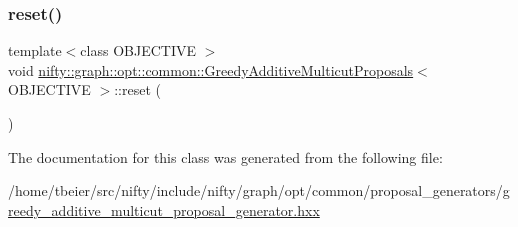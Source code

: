 \subsubsection{\texorpdfstring{reset()}{reset()}}
{\footnotesize\ttfamily template$<$class O\+B\+J\+E\+C\+T\+I\+VE $>$ \\
void \hyperlink{classnifty_1_1graph_1_1opt_1_1common_1_1GreedyAdditiveMulticutProposals}{nifty\+::graph\+::opt\+::common\+::\+Greedy\+Additive\+Multicut\+Proposals}$<$ O\+B\+J\+E\+C\+T\+I\+VE $>$\+::reset (\begin{DoxyParamCaption}{ }\end{DoxyParamCaption})\hspace{0.3cm}{\ttfamily [inline]}}



The documentation for this class was generated from the following file\+:\begin{DoxyCompactItemize}
\item 
/home/tbeier/src/nifty/include/nifty/graph/opt/common/proposal\+\_\+generators/\hyperlink{greedy__additive__multicut__proposal__generator_8hxx}{greedy\+\_\+additive\+\_\+multicut\+\_\+proposal\+\_\+generator.\+hxx}\end{DoxyCompactItemize}
